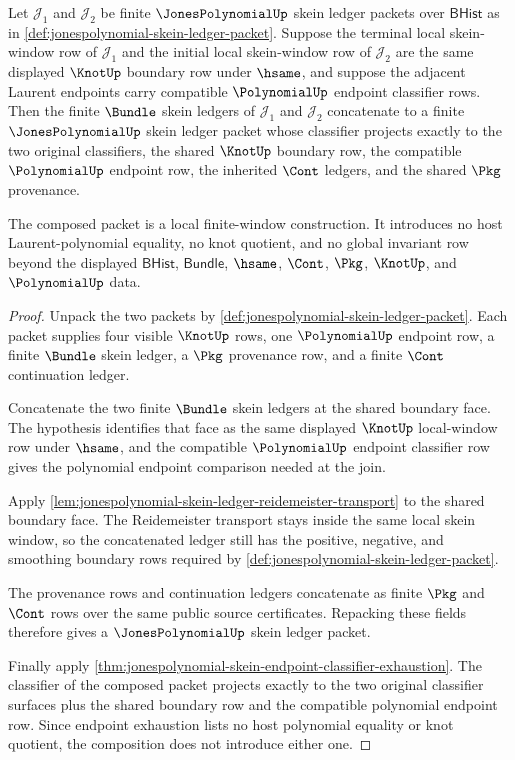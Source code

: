 \begin{theorem}
\label{thm:jonespolynomial-local-skein-window-composition}
Let $\mathcal{J}_1$ and $\mathcal{J}_2$ be finite $\JonesPolynomialUp$ skein
ledger packets over $\mathsf{BHist}$ as in
\autoref{def:jonespolynomial-skein-ledger-packet}. Suppose the terminal local
skein-window row of $\mathcal{J}_1$ and the initial local skein-window row of
$\mathcal{J}_2$ are the same displayed $\KnotUp$ boundary row under $\hsame$,
and suppose the adjacent Laurent endpoints carry compatible $\PolynomialUp$
endpoint classifier rows. Then the finite $\Bundle$ skein ledgers of
$\mathcal{J}_1$ and $\mathcal{J}_2$ concatenate to a finite $\JonesPolynomialUp$
skein ledger packet whose classifier projects exactly to the two original
classifiers, the shared $\KnotUp$ boundary row, the compatible $\PolynomialUp$
endpoint row, the inherited $\Cont$ ledgers, and the shared $\Pkg$ provenance.

The composed packet is a local finite-window construction. It introduces no
host Laurent-polynomial equality, no knot quotient, and no global invariant row
beyond the displayed $\mathsf{BHist}$, $\mathsf{Bundle}$, $\hsame$, $\Cont$,
$\Pkg$, $\KnotUp$, and $\PolynomialUp$ data.
\end{theorem}
\begin{proof}
Unpack the two packets by
\autoref{def:jonespolynomial-skein-ledger-packet}. Each packet supplies four
visible $\KnotUp$ rows, one $\PolynomialUp$ endpoint row, a finite
$\Bundle$ skein ledger, a $\Pkg$ provenance row, and a finite $\Cont$
continuation ledger.

Concatenate the two finite $\Bundle$ skein ledgers at the shared boundary face.
The hypothesis identifies that face as the same displayed $\KnotUp$ local-window
row under $\hsame$, and the compatible $\PolynomialUp$ endpoint classifier row
gives the polynomial endpoint comparison needed at the join.

Apply
\autoref{lem:jonespolynomial-skein-ledger-reidemeister-transport} to the shared
boundary face. The Reidemeister transport stays inside the same local skein
window, so the concatenated ledger still has the positive, negative, and
smoothing boundary rows required by
\autoref{def:jonespolynomial-skein-ledger-packet}.

The provenance rows and continuation ledgers concatenate as finite $\Pkg$ and
$\Cont$ rows over the same public source certificates. Repacking these fields
therefore gives a $\JonesPolynomialUp$ skein ledger packet.

Finally apply
\autoref{thm:jonespolynomial-skein-endpoint-classifier-exhaustion}. The
classifier of the composed packet projects exactly to the two original
classifier surfaces plus the shared boundary row and the compatible polynomial
endpoint row. Since endpoint exhaustion lists no host polynomial equality or
knot quotient, the composition does not introduce either one.
\end{proof}

